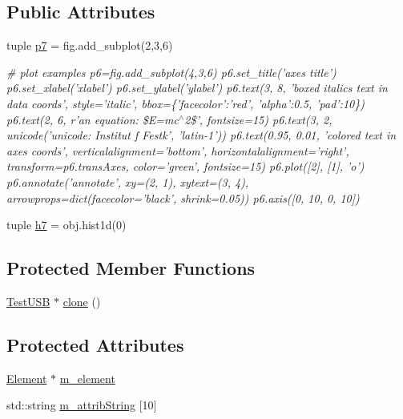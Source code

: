 \subsection*{Public Attributes}
\begin{DoxyCompactItemize}
\item 
tuple \hyperlink{classTestUSB_a9901d0222a34f61c570c41fa6b7d5672}{p7} = fig.add\_\-subplot(2,3,6)
\begin{DoxyCompactList}\small\item\em \# plot examples p6=fig.add\_\-subplot(4,3,6) p6.set\_\-title('axes title') p6.set\_\-xlabel('xlabel') p6.set\_\-ylabel('ylabel') p6.text(3, 8, 'boxed italics text in data coords', style='italic', bbox=\{'facecolor':'red', 'alpha':0.5, 'pad':10\}) p6.text(2, 6, r'an equation: \$E=mc$^\wedge$2\$', fontsize=15) p6.text(3, 2, unicode('unicode: Institut f Festk', 'latin-\/1')) p6.text(0.95, 0.01, 'colored text in axes coords', verticalalignment='bottom', horizontalalignment='right', transform=p6.transAxes, color='green', fontsize=15) p6.plot(\mbox{[}2\mbox{]}, \mbox{[}1\mbox{]}, 'o') p6.annotate('annotate', xy=(2, 1), xytext=(3, 4), arrowprops=dict(facecolor='black', shrink=0.05)) p6.axis(\mbox{[}0, 10, 0, 10\mbox{]}) \item\end{DoxyCompactList}\item 
tuple \hyperlink{classTestUSB_a7ac7e10c72450ba4c5764cefbaec6c4b}{h7} = obj.hist1d(0)
\end{DoxyCompactItemize}
\subsection*{Protected Member Functions}
\begin{DoxyCompactItemize}
\item 
\hyperlink{classTestUSB_1_1TestUSB}{TestUSB} $\ast$ \hyperlink{classTestUSB_a109094c177ccaaa224b514c118c93ce7}{clone} ()
\end{DoxyCompactItemize}
\subsection*{Protected Attributes}
\begin{DoxyCompactItemize}
\item 
\hyperlink{classElement}{Element} $\ast$ \hyperlink{classProcessus_aa9d24d53c3e52f36786cabb5d8e296e7}{m\_\-element}
\item 
std::string \hyperlink{classAttrib_a3414521d7a82476e874b25a5407b5e63}{m\_\-attribString} \mbox{[}10\mbox{]}
\end{DoxyCompactItemize}
